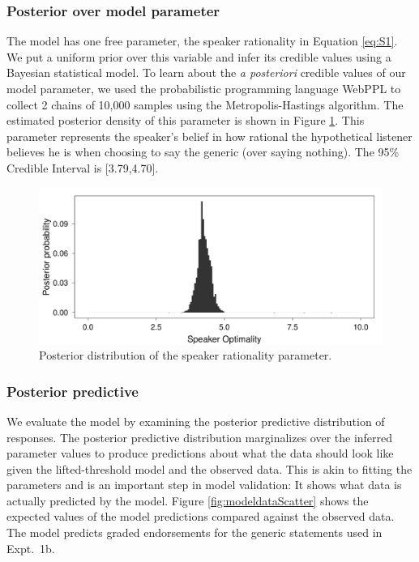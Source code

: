 \documentclass[10pt,letterpaper]{article}
\begin{document}
\subsubsection{Posterior over model parameter}

The model has one free parameter, the speaker rationality in Equation \ref{eq:S1}. 
We put a uniform prior over this variable and infer its credible values using a Bayesian statistical model. 
To learn about the \emph{a posteriori} credible values of our model parameter, we used the probabilistic programming language WebPPL \cite{dippl} to collect 2 chains of 10,000 samples using the Metropolis-Hastings algorithm. 
The estimated posterior density of this parameter is shown in Figure \ref{fig:rationality}. 
This parameter represents the speaker's belief in how rational the hypothetical listener believes he is when choosing to say the generic (over saying nothing). 
The 95\% Credible Interval is [3.79,4.70].

\begin{figure}
\centering
    \includegraphics[width=0.8\columnwidth]{posterior-rationality-truthJudge}
    \caption{Posterior distribution of the speaker rationality parameter.}
  \label{fig:rationality}
\end{figure}


\subsubsection{Posterior predictive}

We evaluate the model by examining the posterior predictive distribution of responses. The posterior predictive distribution marginalizes over the inferred parameter values to produce predictions about what the data should look like given the lifted-threshold model and the observed data. This is akin to fitting the parameters and is an important step in model validation: It shows what data is actually predicted by the model. 
Figure \ref{fig:modeldataScatter} shows the expected values of the model predictions compared against the observed data. 
The model predicts graded endorsements for the generic statements used in Expt.~1b. 
\end{document}
